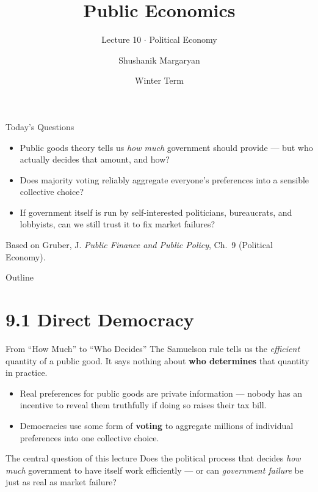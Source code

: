\documentclass[11pt,aspectratio=169]{beamer}
\title{Public Economics}
\subtitle{Lecture 10 \(\cdot\) Political Economy}
\author{Shushanik Margaryan}
\institute{WU Vienna University of Economics and Business}
\date{Winter Term}
\begin{document}
\begin{frame}
  \titlepage
\end{frame}

\begin{frame}{Today's Questions}
  \begin{itemize}
    \item Public goods theory tells us \emph{how much} government should provide --- but who actually decides that amount, and how?
    \item Does majority voting reliably aggregate everyone's preferences into a sensible collective choice?
    \item If government itself is run by self-interested politicians, bureaucrats, and lobbyists, can we still trust it to fix market failures?
  \end{itemize}
  \vspace{1em}
  \begin{block}{Based on}
    Gruber, J. \emph{Public Finance and Public Policy}, Ch.\ 9 (Political Economy).
  \end{block}
\end{frame}

\begin{frame}{Outline}
  \tableofcontents
\end{frame}

\section{9.1 Direct Democracy}

\begin{frame}{From ``How Much'' to ``Who Decides''}
  The Samuelson rule tells us the \emph{efficient} quantity of a public good. It says nothing about \textbf{who determines} that quantity in practice.
  \begin{itemize}
    \item Real preferences for public goods are private information --- nobody has an incentive to reveal them truthfully if doing so raises their tax bill.
    \item Democracies use some form of \textbf{voting} to aggregate millions of individual preferences into one collective choice.
  \end{itemize}
  \vspace{0.4em}
  \begin{alertblock}{The central question of this lecture}
    Does the political process that decides \emph{how much} government to have itself work efficiently --- or can \emph{government failure} be just as real as market failure?
  \end{alertblock}
\end{frame}
\end{document}
